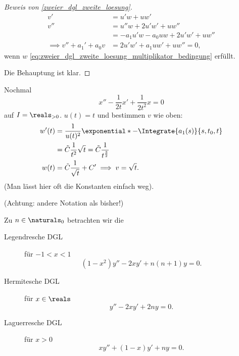 \begin{proof}[Beweis von \ref{zweier_dgl_zweite_loesung}]
  \begin{align*}
    v'&=u'w+uw'\\
    v''&=u''w+2u'w'+uw''\\
    &=-a_1u'w-a_0uw+2u'w'+uw''\\
    \implies v''+a_1'+a_0v&=2u'w'+a_1uw'+uw''=0,
  \end{align*}
  wenn \( w \) \eqref{eq:zweier_dgl_zweite_loesung_multiplikator_bedingung} erfüllt.

  Die  Behauptung ist klar.
\end{proof}
\begin{beispiel*}
  Nochmal
  \begin{equation*}
    x''-\frac{1}{2t}x'+\frac{1}{2t^2}x=0
  \end{equation*}
auf \( I=\reals_{>0} \). \( u(t)=t \) und bestimmen \( v \) wie oben:
\begin{align*}
  w'(t)&=\frac{1}{u(t)^2}\exponential*{-\Integrate{a_1(s)}{s,t_0,t}}\\
  &=\tilde{C}\frac{1}{t^2}\sqrt{t}=\tilde{C}\frac{1}{t^{\frac{3}{2}}}\\
  w(t)&=\tilde{C}\frac{1}{\sqrt{t}}+C'\implies v=\sqrt{t}.
\end{align*}
(Man lässt hier oft die Konstanten einfach weg).
\end{beispiel*}
\begin{generalthm}[Besondere DGL'n mit \( k=2 \), \( n=1 \)]\label{besondere_dlgs}
  (Achtung: andere Notation als bisher!)

  Zu \( n\in \naturals_0 \) betrachten wir die 
  \begin{description}
    \item[Legendresche DGL] für \( -1<x<1 \)
    \begin{equation*}
      (1-x^2)y''-2xy'+n(n+1)y=0.
    \end{equation*}
    \item[Hermitesche DGL] für \( x\in \reals \)
    \begin{equation*}
      y''-2xy'+2ny=0.
    \end{equation*}
    \item[Laguerresche DGL] für \( x>0 \)
    \begin{equation*}
      xy''+(1-x)y'+ny=0.
    \end{equation*}
  \end{description}
\end{generalthm}
